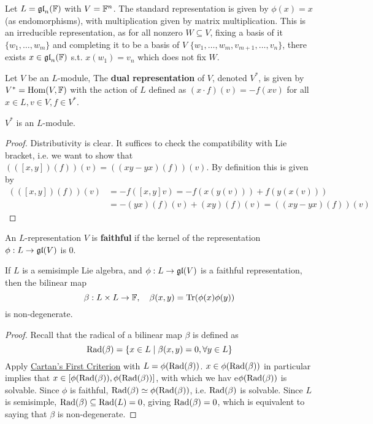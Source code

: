 \documentclass{article}
\begin{document}
\begin{example}
    Let $L = \mathfrak{gl}_n(\mathbb{F})$ with $V = \mathbb{F}^n$. The standard representation is given by $\phi(x) = x$ (as endomorphisms), with multiplication given by matrix multiplication. This is an irreducible representation, as for all nonzero $W \subseteq V$, fixing a basis of it $\{w_1, \dots, w_m\}$ and completing it to be a basis of $V$ $\{ w_1, \dots, w_m, v_{m+1}, \dots, v_n \}$, there exists $x \in \mathfrak{gl}_n(\mathbb{F})$ s.t. $x(w_1) = v_n$ which does not fix $W$.
\end{example}

\begin{definition}
    Let $V$ be an $L$-module, The \textbf{dual representation} of $V$, denoted $V^*$, is given by $V^* = \mathrm{Hom}(V, \mathbb{F})$ with the action of $L$ defined as $(x \cdot f)(v) = -f(xv)$ for all $x \in L, v \in V, f \in V^*$.
\end{definition}

\begin{lemma}
    $V^*$ is an $L$-module.
\end{lemma}

\begin{proof}
    Distributivity is clear. It suffices to check the compatibility with Lie bracket, i.e. we want to show that $(([x, y])(f))(v) = ((xy - yx)(f))(v)$. By definition this is given by
    \begin{align*}
        (([x, y])(f))(v) &= -f([x, y]v) = -f(x(y(v))) + f(y(x(v))) \\
        & = -(yx)(f)(v) + (xy)(f)(v) = ((xy - yx)(f))(v)
    \end{align*}
\end{proof}

\begin{definition}
    An $L$-representation $V$ is \textbf{faithful} if the kernel of the representation $\phi: L \to \mathfrak{gl}(V)$ is 0.
\end{definition}

\begin{proposition}
    If $L$ is a semisimple Lie algebra, and $\phi: L \to \mathfrak{gl}(V)$ is a faithful representation, then the bilinear map 
    \[
        \beta: L \times L \to \mathbb{F}, \quad \beta(x, y) = \operatorname{Tr}(\phi(x) \phi(y))
    \]
    is non-degenerate.
\end{proposition}

\begin{proof}
    Recall that the radical of a bilinear map $\beta$ is defined as
    \[
        \operatorname{Rad}(\beta) = \{ x \in L \mid \beta(x, y) = 0, \forall y \in L \}
    \]
    Apply \hyperref[thm: Cartan's First Criterion]{Cartan's First Criterion} with $L = \phi(\operatorname{Rad}(\beta))$. $x \in \phi(\operatorname{Rad}(\beta))$ in particular implies that $x \in [\phi(\operatorname{Rad}(\beta)), \phi(\operatorname{Rad}(\beta))]$, with which we hav e$\phi(\operatorname{Rad}(\beta))$ is solvable. Since $\phi$ is faithful, $\operatorname{Rad}(\beta) \simeq \phi(\operatorname{Rad}(\beta))$, i.e. $\operatorname{Rad}(\beta)$ is solvable. Since $L$ is semisimple, $\operatorname{Rad}(\beta) \subseteq \operatorname{Rad}(L) = 0$, giving $\operatorname{Rad}(\beta) = 0$, which is equivalent to saying that $\beta$ is non-degenerate.
\end{proof}
\end{document}
